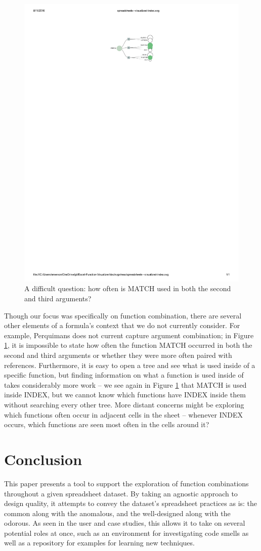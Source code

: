 \documentclass[conference]{IEEEtran}
\newcommand{\toolname}{Perquimans\xspace} \newcommand{\toolnameend}{Perquimans}
\begin{document}
	\begin{figure} \centering \includegraphics[width=.4\textwidth]{index}
		\caption{A difficult question: how often is MATCH used in both the second and
			third arguments?} \label{fig:index} \end{figure}
	
	Though our focus was specifically on function combination, there are several
	other elements of a formula's context that we do not currently consider. For
	example, \toolname does not current capture argument combination; in Figure
	\ref{fig:index}, it is impossible to state how often the function MATCH
	occurred in both the second and third arguments or whether they were more often
	paired with references. Furthermore, it is easy to open a tree and see what is
	used inside of a specific function, but finding information on what a function
	is used inside of takes considerably more work -- we see again in Figure
	\ref{fig:index} that MATCH is used inside INDEX, but we cannot know which
	functions have INDEX inside them without searching every other tree. More
	distant concerns might be exploring which functions often occur in adjacent
	cells in the sheet -- whenever INDEX occurs, which functions are seen most
	often in the cells around it?
	
	\section{Conclusion}
	
	This paper presents a tool to support the exploration of function combinations
	throughout a given spreadsheet dataset. By taking an agnostic approach to
	design quality, it attempts to convey the dataset's spreadsheet practices as
	is: the common along with the anomalous, and the well-designed along with the
	odorous. As seen in the user and case studies, this allows it to take on
	several potential roles at once, such as an environment for investigating code
	smells as well as a repository for examples for learning new techniques.
	
\end{document}
